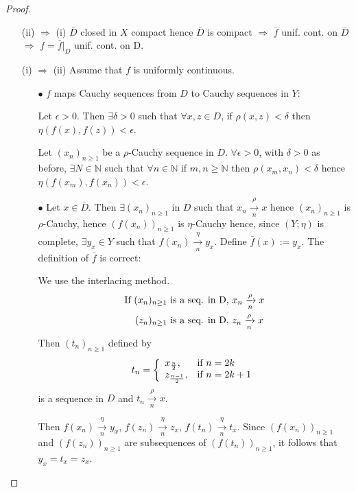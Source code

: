 \documentclass[12pt]{amsbook}
\theoremstyle{definition}
\newcommand{\NN}{{\mathbb N}}
\newcommand{\Ra}{\Rightarrow} %
\begin{document}
\begin{proof}
\begin{itemize}
\item[(ii) $\Ra$ (i)] $\bar D$ closed in $X$ compact hence $\bar D$ is compact $\Ra$ $\bar f$ unif. cont. on $\bar D$ $\Ra$ $f = \bar f|_D$ unif. cont. on D.
\item[(i) $\Ra$ (ii)] Assume that $f$ is uniformly continuous.

\begin{itemize}
\item[$\bullet$] $f$ maps Cauchy sequences from $D$ to Cauchy sequences in $Y$:

Let $\epsilon > 0$. Then $\exists \delta > 0$ such that $\forall x, z \in D$, if $\rho(x,z) < \delta$ then $\eta(f(x), f(z)) < \epsilon$.

Let $(x_n)_{n \geq 1}$ be a $\rho$-Cauchy sequence in $D$.
$\forall \epsilon > 0$, with $\delta > 0$ as before, $\exists N \in \NN$ such that $\forall n \in \NN$ if $m, n \geq \NN$ then $\rho(x_m, x_n) < \delta$ hence $\eta(f(x_m), f(x_n)) < \epsilon$.

\item[$\bullet$] Let $x \in \bar D$. Then $\exists (x_n)_{n \geq 1}$ in $D$ such that $x_n \xrightarrow[n]{\rho} x$ hence $(x_n)_{n \geq 1}$ is $\rho$-Cauchy, hence $(f(x_n))_{n \geq 1}$ is $\eta$-Cauchy hence, since $(Y; \eta)$ is complete, $\exists y_x \in Y$ such that $f(x_n) \xrightarrow[n]{\eta} y_x$. Define $\bar f(x) := y_x$. The definition of $\bar f$ is correct:

We use the interlacing method.
\begin{align*}
\textup{If } 
(x_n)_{n \geq 1} \textup{ is a seq. in D, } & x_n \xrightarrow[n]{\rho} x \\
(z_n)_{n \geq 1} \textup{ is a seq. in D, } & z_n \xrightarrow[n]{\rho} x
\end{align*}
Then $(t_n)_{n \geq 1}$ defined by
\begin{equation*}
t_n =\left\{\begin{array}{ll}{x_{\frac{n}{2}},} & {\textup{if } n = 2k} \\ {z_{\frac{n-1}{2}},} & {\textup{if } n = 2k+1}\end{array}\right.
\end{equation*}
is a sequence in $D$ and $t_n \xrightarrow[n]{\rho} x$. %

Then $f(x_n) \xrightarrow[n]{\eta} y_x$, $f(z_n) \xrightarrow[n]{\eta} z_x$, $f(t_n) \xrightarrow[n]{\eta} t_x$. Since $(f(x_n))_{n \geq 1}$ and $(f(z_n))_{n \geq 1}$ are subsequences of $(f(t_n))_{n \geq 1}$, it follows that $y_x = t_x = z_x$.


\end{itemize}
\end{itemize}
\end{proof}
\end{document}
